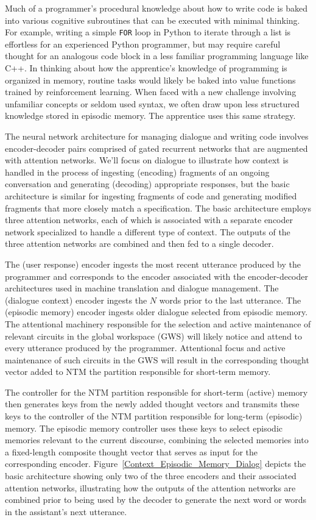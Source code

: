 Much of a programmer's procedural knowledge about how to write code is baked into various cognitive subroutines that can be executed with minimal thinking. For example, writing a simple {\tt{FOR}} loop in Python to iterate through a list is effortless for an experienced Python programmer, but may require careful thought for an analogous code block in a less familiar programming language like C++. In thinking about how the apprentice's knowledge of programming is organized in memory, routine tasks would likely be baked into value functions trained by reinforcement learning. When faced with a new challenge involving unfamiliar concepts or seldom used syntax, we often draw upon less structured knowledge stored in episodic memory. The apprentice uses this same strategy.

The neural network architecture for managing dialogue and writing code involves encoder-decoder pairs comprised of gated recurrent networks that are augmented with attention networks. We'll focus on dialogue to illustrate how context is handled in the process of ingesting (encoding) fragments of an ongoing conversation and generating (decoding) appropriate responses, but the basic architecture is similar for ingesting fragments of code and generating modified fragments that more closely match a specification. The basic architecture employs three attention networks, each of which is associated with a separate encoder network specialized to handle a different type of context. The outputs of the three attention networks are combined and then fed to a single decoder.

The (user response) encoder ingests the most recent utterance produced by the programmer and corresponds to the encoder associated with the encoder-decoder architectures used in machine translation and dialogue management. The (dialogue context) encoder ingests the $N$ words prior to the last utterance. The (episodic memory) encoder ingests older dialogue selected from episodic memory. The attentional machinery responsible for the selection and active maintenance of relevant circuits in the global workspace (GWS) will likely notice and attend to every utterance produced by the programmer. Attentional focus and active maintenance of such circuits in the GWS will result in the corresponding thought vector added to NTM the partition responsible for short-term memory.  

The controller for the NTM partition responsible for short-term (active) memory then generates keys from the newly added thought vectors and transmits these keys to the controller of the NTM partition responsible for long-term (episodic) memory. The episodic memory controller uses these keys to select episodic memories relevant to the current discourse, combining the selected memories into a fixed-length composite thought vector that serves as input for the corresponding encoder. Figure~\ref{Context_Episodic_Memory_Dialog} depicts the basic architecture showing only two of the three encoders and their associated attention networks, illustrating how the outputs of the attention networks are combined prior to being used by the decoder to generate the next word or words in the assistant's next utterance. 

